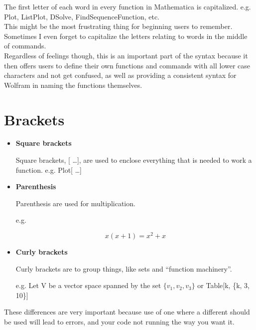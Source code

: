 \documentclass[11pt,letterpaper,twoside,titlepage]{report}
\begin{document}
			The first letter of each word in every function in Mathematica is capitalized.  e.g. Plot, ListPlot, DSolve, FindSequenceFunction, etc. \\
			
			This might be the most frustrating thing for beginning users to remember.  Sometimes I even forget to capitalize the letters relating to words in the middle of commands. \\
			
			Regardless of feelings though, this is an important part of the syntax because it then offers users to define their own functions and commands with all lower case characters and not get confused, as well as providing a consistent syntax for Wolfram in naming the functions themselves.
			
		\chapter{Brackets}
			
			\begin{itemize}
				
				\item %
					
					\textbf{Square brackets}
					
					Square brackets, [ \dots ], are used to enclose everything that is needed to work a function.  e.g. Plot[ \dots ]
					
				\item %
					
					\textbf{Parenthesis}
					
					Parenthesis are used for multiplication. 
						
					e.g. 
					
					\[ x( x + 1 ) = x^2 + x \]
					
				\item %
					
					\textbf{Curly brackets}
					
					Curly brackets are to group things, like sets and ``function machinery''.
						
					e.g. Let V be a vector space spanned by the set $ \{ v_1 , v_2, v_3 \} $ or Table[k, \{k, 3, 10\}]

			\end{itemize}
			
			These differences are very important because use of one where a different should be used will lead to errors, and your code not running the way you want it.
			
\end{document}
